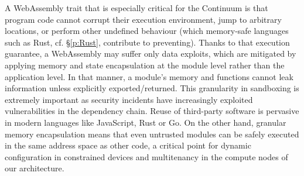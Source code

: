 




A WebAssembly trait that is especially critical for the Continuum is that program code cannot corrupt their execution environment, jump to arbitrary locations, or perform other undefined behaviour (which memory-safe languages such as Rust, cf. §\ref{p:Rust}, contribute to preventing). 
Thanks to that execution guarantee, a WebAssembly may suffer only data exploits, which are mitigated by applying memory and state encapsulation at the module level rather than the application level. In that manner, a module's memory and functions cannot leak information unless explicitly exported/returned. 
This granularity in sandboxing is extremely important as security incidents have increasingly exploited vulnerabilities in the dependency chain. Reuse of third-party software is pervasive in modern languages like JavaScript, Rust or Go. 
On the other hand, granular memory encapsulation means that even untrusted modules can be safely executed in the same address space as other code, a critical point for dynamic configuration in constrained devices and multitenancy in the compute nodes of our architecture.

